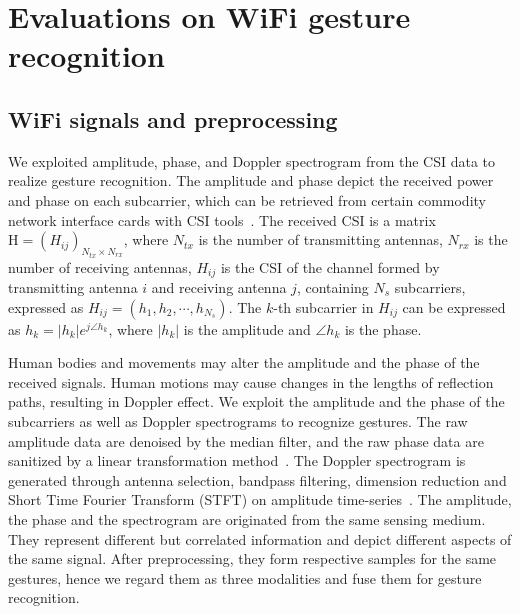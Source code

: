 \documentclass[journal]{IEEEtran}
\begin{document}
\section{Evaluations on WiFi gesture recognition}
\label{SecWiFi}

\subsection{WiFi signals and preprocessing}
We exploited amplitude, phase, and Doppler spectrogram from the CSI data to realize gesture recognition. The amplitude and phase depict the received power and phase on each subcarrier, which can be retrieved from certain commodity network interface cards with CSI tools~\cite{Halperin:2010, XieY:2015}. The received CSI is a matrix ${\mathrm{H}}=\left( {H}_{ij} \right)_{N_{tx}\times N_{rx}}$, where $N_{tx}$ is the number of transmitting antennas, $N_{rx}$ is the number of receiving antennas, ${H}_{ij}$ is the CSI of the channel formed by transmitting antenna $i$ and receiving antenna $j$, containing $N_s$ subcarriers, expressed as ${H}_{ij}=(h_1,h_2,\cdots,h_{N_s})$. The $k$-th subcarrier in ${H}_{ij}$ can be expressed as $h_k=|h_k|e^{j\angle h_k}$, where $|h_k|$ is the amplitude and $\angle h_k$ is the phase.  

Human bodies and movements may alter the amplitude and the phase of the received signals. Human motions may cause changes in the lengths of reflection paths, resulting in Doppler effect. We exploit the amplitude and the phase of the subcarriers as well as Doppler spectrograms to recognize gestures. The raw amplitude data are denoised by the median filter, and the raw phase data are sanitized by a linear transformation method~\cite{QianK:2014}. The Doppler spectrogram is generated through antenna selection, bandpass filtering, dimension reduction and Short Time Fourier Transform (STFT) on amplitude time-series~\cite{QianK:2017}. The amplitude, the phase and the spectrogram are originated from the same sensing medium. They represent different but correlated information and depict different aspects of the same signal. After preprocessing, they form respective samples for the same gestures, hence we regard them as three modalities and fuse them for gesture recognition. 
\end{document}
